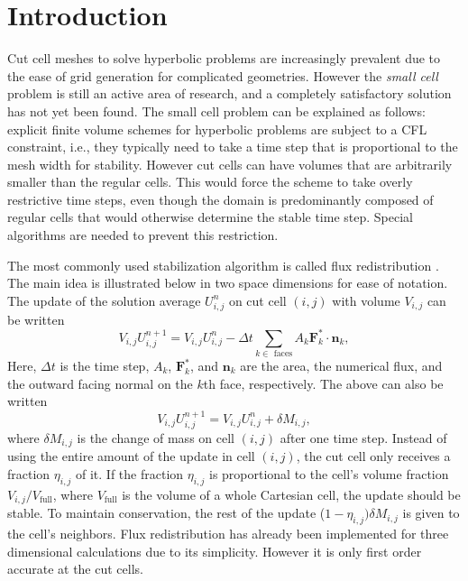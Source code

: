 \section{Introduction}\label{sec:intro}
Cut cell meshes to solve hyperbolic problems 
are increasingly prevalent due to the ease 
of grid generation for complicated geometries. 
However the {\em small cell} problem is still an active area of research, and
a completely satisfactory solution has not yet been found.
The small cell problem can be explained as follows: explicit
finite volume schemes for hyperbolic problems are subject to a CFL constraint, i.e.,  they typically need to take a time step that is proportional to the mesh width for
stability. However cut cells can have volumes that are arbitrarily smaller than the regular cells.  This would force the scheme to take overly restrictive time steps, even though the domain is predominantly composed of regular cells that would otherwise determine the stable time step. Special algorithms are needed to prevent this restriction.

The most commonly used stabilization algorithm is called flux
redistribution \cite{chern:colella,vof:colella}. The main idea is illustrated below in two space
dimensions for ease of notation.
The update of the solution average 
$U^n_{i,j}$ on cut cell $(i,j)$ with volume
$V_{i,j}$ can be written
\begin{equation*}
V_{i,j} U_{i,j} ^{n+1}  = V_{i,j} U_{i,j}^n  -  \Delta t \sum_{k \in \text{ faces}}A_k \mathbf{F}_k^* \cdot \mathbf{n}_k,
\end{equation*}
Here, $\Delta t$ is the time step, $A_k$, $\mathbf{F}_k^*$, and $\mathbf{n}_k$ are the area, the numerical flux, and the outward facing normal on the $k$th face, respectively.
The above can also be written
\begin{equation*}
V_{i,j} U_{i,j} ^{n+1} = V_{i,j} U_{i,j}^n  +  \delta  M_{i,j} ,
\end{equation*}
where $\delta M_{i,j}$ is the change of mass on cell $(i,j)$ after one time step.
Instead of using the entire amount of the update in cell $(i,j)$, 
the cut cell only receives a fraction $\eta_{i,j}$ of it.  If the fraction $\eta_{i,j}$
is proportional to the cell's volume fraction $V_{i,j}/V_{\text{full}}$, where $V_{\text{full}}$ is the volume of a whole Cartesian cell, the update should be stable. 
To maintain conservation, the rest of the update ($1-\eta_{i,j})\delta M_{i,j}$
is given to the cell's neighbors.  
Flux redistribution has already been implemented for three dimensional
calculations due to its simplicity. However it is only first order accurate at the cut cells.

